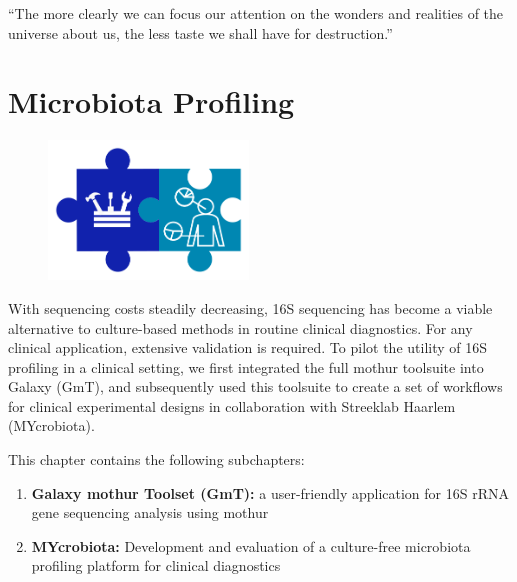 \begin{savequote}[75mm]
“The more clearly we can focus our attention on the wonders and realities of the universe about us, the less taste we shall have for destruction.”
\end{savequote}

\chapter{Microbiota Profiling}\label{chapter:microbiota}
\setcounter{figure}{-1}
\setcounter{table}{-1}
\setcounter{section}{-1}

\begin{figure}[t!]
\includegraphics[height=10em]{frontmatter/images/chapter-header-microbiota-tools.png}
\end{figure}
\setcounter{figure}{-1}
\setcounter{table}{-1}
\setcounter{section}{-1}

With sequencing costs steadily decreasing, 16S sequencing has become a viable alternative to culture-based methods in routine clinical diagnostics. For any clinical application, extensive validation is required. To pilot the utility of 16S profiling in a clinical setting, we first integrated the full mothur toolsuite into Galaxy (GmT), and subsequently used this toolsuite to create a set of workflows for clinical experimental designs in collaboration with Streeklab Haarlem (MYcrobiota).

This chapter contains the following subchapters:

\begin{enumerate}
\itemsep-0.5em
\item \textbf{Galaxy mothur Toolset (GmT):} a user-friendly application for 16S rRNA gene sequencing analysis using mothur
\item \textbf{MYcrobiota:} Development and evaluation of a culture-free microbiota profiling platform for clinical diagnostics
\end{enumerate}


